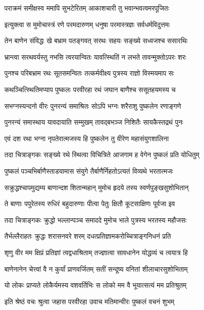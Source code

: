 \twolineshloka
{पराक्रमं समीक्षस्व ममापि सुभटेरितम्}
{आकाशचारी तु भवान्भवत्वमरपूजितः}%

\twolineshloka
{इत्युक्त्वा स मुमोचास्त्रं रणे परमदारुणम्}
{धनुषा परमास्त्रज्ञः सर्वधर्मविदुत्तमः}%

\twolineshloka
{तेन बाणेन संविद्धः खे बभ्राम पतङ्गवत्}
{सरथः सहयः सङ्ख्ये सध्वजश्च ससारथिः}%

\twolineshloka
{भ्रान्त्वा सरथवर्यस्तु नभसि त्वरयान्वितः}
{यावत्स्थितिं न लभते तावन्मुक्तोऽपरः शरः}%

\twolineshloka
{पुनश्च परिबभ्राम रथः सूतसमन्वितः}
{तत्कर्मवीक्ष्य पुत्रस्य राज्ञो विस्मयमाप सः}%

\twolineshloka
{कथञ्चित्स्थितिमप्याप पुष्कलः परवीरहा}
{रथं जघान बाणैश्च ससूतहयमस्य च}%

\twolineshloka
{सभग्नस्यन्दनो वीरः पुनरन्यं समाश्रितः}
{सोऽपि भग्नः शरैराशु पुष्कलेन रणाङ्गणे}%

\twolineshloka
{पुनरन्यं समास्थाय यावदायाति सम्मुखम्}
{तावद्बभञ्ज निशितैः सायकैस्तद्रथं पुनः}%

\twolineshloka
{एवं दश रथा भग्ना नृपतेरात्मजस्य हि}
{पुष्कलेन तु वीरेण महासंयुगशालिना}%

\twolineshloka
{तदा चित्राङ्गकः सङ्ख्ये रथे स्थित्वा विचित्रिते}
{आजगाम ह वेगेन पुष्कलं प्रति योधितुम्}%

\twolineshloka
{पुष्कलं पञ्चभिर्बाणैस्ताडयामास संयुगे}
{तैर्बाणैर्निहतोऽत्यतं विव्यथे भरतात्मजः}%

\twolineshloka
{सक्रुद्धश्चापमुद्यम्य बाणान्दश शितान्महान्}
{मुमोच हृदये तस्य स्वर्णपुङ्खसुशोभितान्}%

\twolineshloka
{ते बाणाः पपुरेतस्य रुधिरं बहुदारुणाः}
{पीत्वा पेतुः क्षितौ कूटसाक्षिणः पूर्वजा इव}%

\twolineshloka
{तदा चित्राङ्गकः क्रुद्धो भल्लान्पञ्च समाददे}
{मुमोच भाले पुत्रस्य भरतस्य महौजसः}%

\twolineshloka
{तैर्भल्लैराहतः क्रुद्धः शरासनवरे शरम्}
{दधत्प्रतिज्ञामकरोच्चित्राङ्गनिधनं प्रति}%

\twolineshloka
{शृणु वीर मम क्षिप्रं प्रतिज्ञां त्वद्वधाश्रिताम्}
{तज्ज्ञात्वा सावधानेन योद्धव्यं च त्वयात्र हि}%

\twolineshloka
{बाणेनानेन चेत्त्वां वै न कुर्यां प्राणवर्जितम्}
{सतीं सन्दूष्य वनितां शीलाचारसुशोभिताम्}%

\twolineshloka
{यो लोकः प्राप्यते लोकैर्यमस्य वशवर्तिभिः}
{स लोको मम वै भूयात्सत्यं मम प्रतिश्रुतम्}%

\twolineshloka
{इति श्रेष्ठं वचः श्रुत्वा जहास परवीरहा}
{उवाच मतिमान्वीरः पुष्कलं वचनं शुभम्}%

